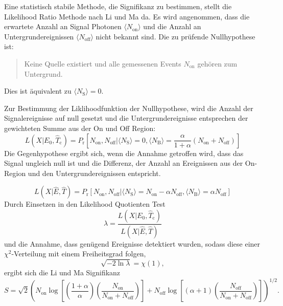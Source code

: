 Eine statistisch stabile Methode, die Signifikanz zu bestimmen, stellt die
Likelihood Ratio Methode nach Li und Ma da.
Es wird angenommen, dass die erwartete Anzahl an Signal
Photonen $\langle N_\text{on} \rangle$ und die Anzahl an Untergrundereignissen
$\langle N_\text{off} \rangle$ nicht bekannt sind.
Die zu prüfende Nullhypothese ist:
\begin{quote}
	Keine Quelle existiert und
    alle gemessenen Events $N_\text{on}$ gehören zum Untergrund.
\end{quote}
Dies ist äquivalent zu $\langle N_\text{S} \rangle=0$.

Zur Bestimmung der Liklihoodfunktion der Nullhypothese,
wird die Anzahl der Signalereignisse auf null gesetzt
und die Untergrundereignisse entsprechen der
gewichteten Summe aus der On und Off Region:
\begin{equation}
	L(X|E_0, \hat{T}_\text{c})= P_\text{r} \left[
		N_\text{on}, N_\text{off} |
		\langle N_\text{S} \rangle = 0,
		\langle N_\text{B} \rangle = \frac{\alpha}{1 + \alpha} (N_\text{on} +
			N_\text{off})
	\right]
\end{equation}
Die Gegenhypothese ergibt sich, 
wenn die Annahme getroffen wird, 
dass das Signal ungleich null ist 
und die Differenz,
der Anzahl an Ereignissen aus der On-Region 
und den Untergrundereignissen entspricht.

\begin{equation}
	L(X|\hat{E}, \hat{T})= P_\text{r} \left[
		N_\text{on}, N_\text{off} |
		\langle N_\text{S} \rangle = N_\text{on} - \alpha N_\text{off},
		\langle N_\text{B} \rangle = \alpha N_\text{off}
	\right]
\end{equation}
Durch Einsetzen in den Likelihood Quotienten Test
\begin{equation}
	\lambda = \frac{L(X|E_0, \hat{T}_\text{c})}{L(X|\hat{E}, \hat{T})}
\end{equation}
und die Annahme, dass genügend Ereignisse detektiert wurden, sodass diese einer
$\chi^2$-Verteilung mit einem Freiheitsgrad folgen,
\begin{equation}
	\sqrt{- 2 \ln \lambda} = \chi(1),
\end{equation}
ergibt sich die Li und Ma Signifikanz
\begin{equation}
  S = \sqrt{2} {\left(
      N_\text{on} \log \left[
        \left( \frac{1 + \alpha}{\alpha} \right) \left(
          \frac{N_\text{on}}{N_\text{on} + N_\text{off}}
        \right)
      \right]
      + N_\text{off} \log \left[
        (\alpha + 1) \left(
          \frac{N_\text{off}}{N_\text{on} + N_\text{off}}
        \right)
      \right]
  \right)} ^ {1/2}.
\end{equation}

